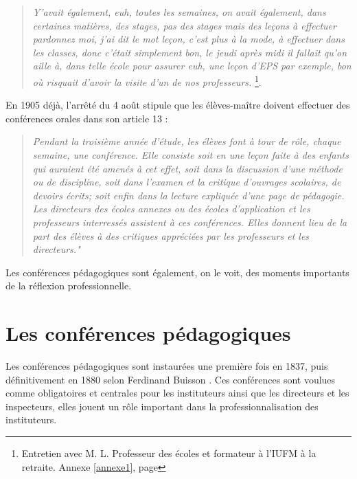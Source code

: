 \documentclass[a4paper,11pt]{article}
\begin{document}
			\begin{quote}
			 \emph{Y'avait également, euh, toutes les semaines, on avait également, dans certaines matières, des stages, pas des stages mais des leçons à effectuer pardonnez moi, j'ai dit le mot leçon, c'est plus à la mode, à effectuer dans les classes, donc c'était simplement bon, le jeudi après midi il fallait qu'on aille à, dans telle école pour assurer euh, une leçon d'EPS par exemple, bon où risquait d'avoir la visite d'un de nos professeurs.} \footnote{Entretien avec M. L. Professeur des écoles et formateur à l'IUFM à la retraite. Annexe \ref{annexe1}, page \pageref{annexe1}}. 
			\end{quote}
			 En 1905 déjà, l'arrêté du 4 août stipule que les élèves-maître doivent effectuer des conférences orales dans son article 13 :
			 \begin{quote}
			  \emph{Pendant la troisième année d'étude, les élèves font à tour de rôle, chaque semaine, une conférence. Elle consiste soit en une leçon faite à des enfants qui auraient été amenés à cet effet, soit dans la discussion d'une méthode ou de discipline, soit dans l'examen et la critique d'ouvrages scolaires, de devoirs écrits; soit enfin dans la lecture expliquée d'une page de pédagogie. Les directeurs des écoles annexes ou des écoles d'application et les professeurs interressés assistent à ces conférences. Elles donnent lieu de la part des élèves à des critiques appréciées par les professeurs et les directeurs."}
			 \end{quote}
			  Les conférences pédagogiques sont également, on le voit, des moments importants de la réflexion professionnelle.
			\section{Les conférences pédagogiques}
			Les conférences pédagogiques sont instaurées une première fois en 1837, puis définitivement en 1880 selon Ferdinand Buisson \cite{bui11}. Ces conférences sont voulues comme obligatoires et centrales pour les instituteurs ainsi que les directeurs et les inspecteurs, elles jouent un rôle important dans la professionnalisation des instituteurs.
\end{document}
